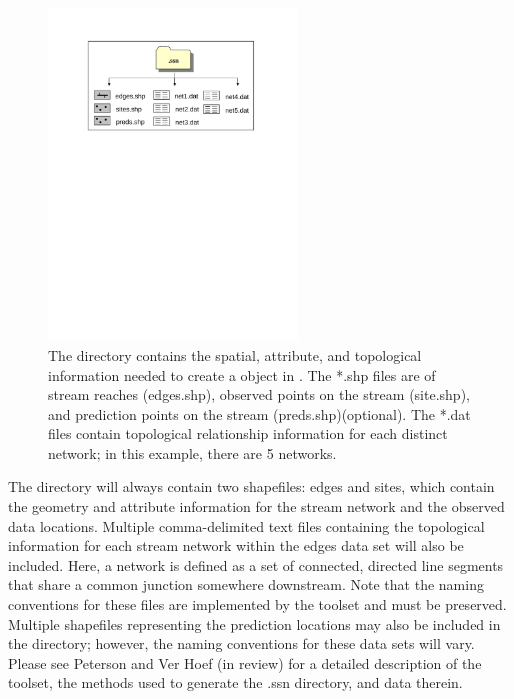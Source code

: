 \documentclass[nojss]{jss}
\begin{document}
\begin{figure}[htbp]
  \begin{center}
    \includegraphics[height=250pt,keepaspectratio]{Figures/jss984Fig-dotSSNdirectory.pdf}
  \end{center}
  \caption{The  directory contains the spatial, attribute, and
    topological information needed to create a 
    object in . The *.shp files are of stream reaches (edges.shp), observed points on the stream (site.shp), and prediction points on the stream (preds.shp)(optional). The *.dat files contain topological relationship information for each distinct network; in this example, there are 5 networks. \label{dotSSNdirectory}}
\end{figure}

The  directory will always contain two shapefiles: edges
and sites, which contain the geometry and attribute information for
the stream network and the observed data locations. Multiple
comma-delimited text files containing the topological information for
each stream network within the edges data set will also be
included. Here, a network is defined as a set of connected, directed
line segments that share a common junction somewhere downstream. Note
that the naming conventions for these files are implemented by the
 toolset and must be preserved. Multiple shapefiles
representing the prediction locations may also be included in the
 directory; however, the naming conventions for these data
sets will vary. Please see Peterson and Ver Hoef (in review) for a
detailed description of the  toolset, the methods used to
generate the .ssn directory, and data therein.
\end{document}
